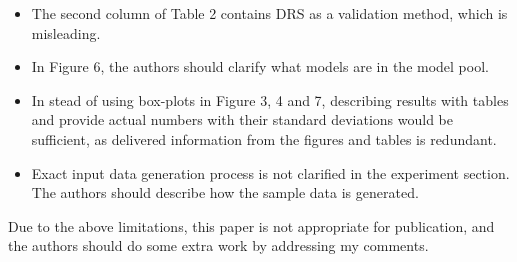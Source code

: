 \documentclass[a4paper, 9pt]{scrartcl}
\begin{document}
\begin{itemize}
    \item The second column of Table 2 contains DRS as a validation method, which is
        misleading.

    \item In Figure 6, the authors should clarify what models are in the model pool.

    \item In stead of using box-plots in Figure 3, 4 and 7, describing results
        with tables and provide actual numbers with their standard deviations
        would be sufficient, as delivered information from the figures and tables
        is redundant.

    \item  Exact input data generation process is not clarified in the
        experiment section. The authors should describe how the sample data is
        generated.

\end{itemize}

Due to the above limitations, this paper is not appropriate for publication, and
the authors should do some extra work by addressing my comments.
\end{document}
